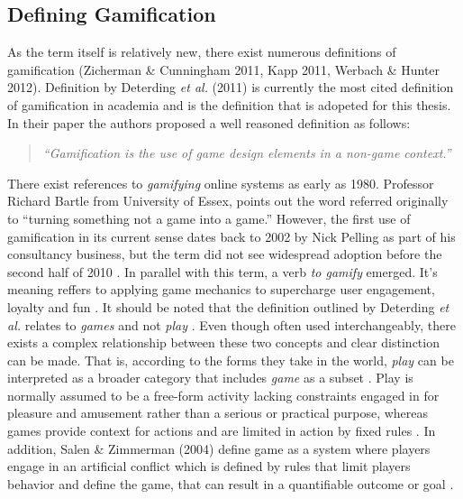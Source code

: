 \subsection{Defining Gamification}
As  the  term  itself  is  relatively  new,  there  exist  numerous definitions  of  gamification  (Zicherman \&  Cunningham 2011, Kapp 2011, Werbach \& Hunter 2012). Definition by Deterding \textit{et al.} (2011) is currently the most cited definition of gamification in academia and is the definition that is adopeted for this thesis. In their paper the authors proposed a well reasoned definition as follows:
\begin{quotation}
\textit{``Gamification is the use of game design elements in a non-game context.''}
\end{quotation}
There exist references to \textit{gamifying} online systems as early as 1980. Professor Richard Bartle from University of Essex, points out the word referred originally to ``turning something not a game into a game.''\cite{werbach2012win}%
 However, the first use of gamification in its current sense dates back to 2002 by Nick Pelling as part of his consultancy business, but the term did not see widespread adoption before the second half of 2010 \cite{marczewski2013gamification}. In parallel with this term, a verb \textit{to gamify} emerged. It's meaning reffers to applying game mechanics to supercharge user engagement, loyalty and fun \cite{toGamify}. 
It should be noted that the definition outlined by Deterding \textit{et al.} relates to \textit{games} and not \textit{play} \cite{deterding2011game}. %
Even though often used interchangeably, there exists a complex relationship between these two concepts and clear distinction can be made. That is, according to the forms they take in the world, \textit{play} can be interpreted as a broader category that includes \textit{game} as a subset \cite{salen2004rules}. Play is normally assumed to be a free-form activity lacking constraints engaged in for pleasure and amusement rather than a serious or practical purpose, whereas games provide context for actions and are limited in action by fixed rules \cite{juul2011half}. In addition, Salen \& Zimmerman (2004) define game as a system where players engage in an artificial conflict which is defined by rules that limit players behavior and define the game, that can result in a quantifiable outcome or goal \cite{salen2004rules}.%
